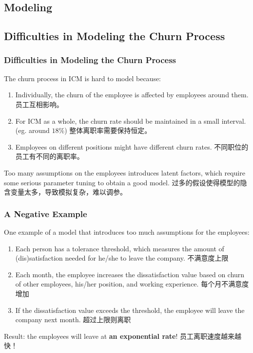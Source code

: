 \documentclass{beamer}
\begin{document}
\begin{CJK*}{UTF8}{gbsn}
\section{Modeling}
\subsection{Difficulties in Modeling the Churn Process}
\begin{frame}
\frametitle{Difficulties in Modeling the Churn Process}
The churn process in ICM is hard to model because:
\begin{enumerate}
\item Individually, the churn of the employee is affected by employees around them. 员工互相影响。
\item For ICM as a whole, the churn rate should be maintained in a small interval. (eg. around $18\%$) 整体离职率需要保持恒定。
\item Employees on different positions might have different churn rates. 不同职位的员工有不同的离职率。

\end{enumerate}

Too many assumptions on the employees introduces latent factors, which require some serious parameter tuning to obtain a good model. 过多的假设使得模型的隐含变量太多，导致模拟复杂，难以调参。


\end{frame}

\begin{frame}
\frametitle{A Negative Example}
One example of a model that introduces too much assumptions for the employees:
\begin{enumerate}
\item Each person has a tolerance threshold, which measures the amount of (dis)satisfaction needed for he/she to leave the company. 不满意度上限
\item Each month, the employee increases the dissatisfaction value based on churn of other employees, his/her position, and working experience. 每个月不满意度增加
\item If the dissatisfaction value exceeds the threshold, the employee will leave the company next month. 超过上限则离职
\end{enumerate}
Result: the employees will leave at {\bf an exponential rate}! 员工离职速度越来越快！
\end{frame}

\end{CJK*}
\end{document}
